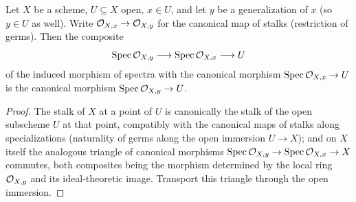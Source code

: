 \begin{lemma}
  \label{pa-lem:fromSpecStalkOfMem_stalkSpecializes}
  \leanok

  Let \(X\) be a scheme, \(U \subseteq X\) open, \(x \in U\), and let \(y\) be a
  generalization of \(x\) (so \(y \in U\) as well). Write
  \(\mathcal{O}_{X,x} \to \mathcal{O}_{X,y}\) for the canonical map of stalks (restriction of
  germs). Then the composite
  \[
    \operatorname{Spec} \mathcal{O}_{X,y} \longrightarrow \operatorname{Spec} \mathcal{O}_{X,x} \longrightarrow U
  \]
  of the induced morphism of spectra with the canonical morphism
  \(\operatorname{Spec} \mathcal{O}_{X,x} \to U\) is the canonical morphism \(\operatorname{Spec} \mathcal{O}_{X,y} \to U\).
\end{lemma}
\begin{proof}
  \leanok
  The stalk of \(X\) at a point of \(U\) is canonically the stalk of the open subscheme
  \(U\) at that point, compatibly with the canonical maps of stalks along
  specializations (naturality of germs along the open immersion \(U \to X\)); and on
  \(X\) itself the analogous triangle of canonical morphisms
  \(\operatorname{Spec} \mathcal{O}_{X,y} \to \operatorname{Spec} \mathcal{O}_{X,x} \to X\) commutes, both composites being the
  morphism determined by the local ring \(\mathcal{O}_{X,y}\) and its ideal-theoretic image.
  Transport this triangle through the open immersion.
\end{proof}

